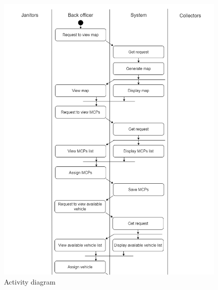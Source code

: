\documentclass[a4paper]{article}
\begin{document}
\hypertarget{activity}{
\begin{figure}
\centering
  \includegraphics[width=1\linewidth]{ActivityDiagram1.png}
  \caption{Activity diagram}
\end{figure}}
\end{document}
